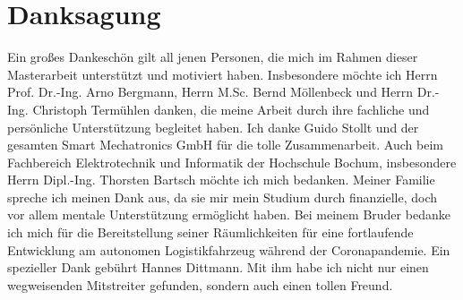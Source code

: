 \documentclass[12pt,a4paper,oneside,numbers=noenddot,headsepline,captions=tableheading,toc=bibliography,openany,tikz,margin=5mm]{scrbook}
\begin{document}
	
	\chapter*{\textbf{Danksagung}}
	
	
	
	Ein großes Dankeschön gilt all jenen Personen, die mich im Rahmen dieser Masterarbeit
	unterstützt und motiviert haben. Insbesondere möchte ich Herrn Prof. Dr.-Ing. Arno Bergmann, Herrn M.Sc. Bernd Möllenbeck und Herrn Dr.-Ing. Christoph Termühlen danken, die meine Arbeit durch ihre fachliche und persönliche Unterstützung begleitet haben. Ich danke Guido Stollt und der gesamten Smart Mechatronics GmbH für die tolle Zusammenarbeit. Auch beim Fachbereich Elektrotechnik und Informatik der Hochschule Bochum, insbesondere Herrn Dipl.-Ing. Thorsten Bartsch möchte ich mich bedanken. Meiner Familie spreche ich meinen Dank aus, da sie mir mein Studium durch finanzielle, doch vor allem mentale Unterstützung ermöglicht haben. Bei meinem Bruder bedanke ich mich für die Bereitstellung seiner Räumlichkeiten für eine fortlaufende Entwicklung am autonomen Logistikfahrzeug während der Coronapandemie. Ein spezieller Dank gebührt Hannes Dittmann. Mit ihm habe ich nicht nur einen wegweisenden Mitstreiter gefunden, sondern auch einen tollen Freund.
	
	
	\tableofcontents
	\cleardoublepage
	
	
	
\end{document}
